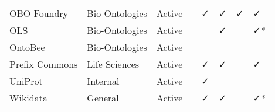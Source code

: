 \begin{table}
\begin{tabular}{llllllll}
    OBO Foundry &  Bio-Ontologies &       Active &                           &                      ✓ &                              ✓ &                           ✓ &                      ✓ \\
            OLS &  Bio-Ontologies &       Active &                           &                        &                              ✓ &                             &                     ✓* \\
        OntoBee &  Bio-Ontologies &       Active &                           &                        &                                &                             &                        \\
 Prefix Commons &   Life Sciences &       Active &                           &                      ✓ &                              ✓ &                             &                      ✓ \\
        UniProt &        Internal &       Active &                           &                      ✓ &                                &                             &                        \\
       Wikidata &         General &       Active &                           &                      ✓ &                              ✓ &                             &                     ✓* \\
\bottomrule
\end{tabular}
\end{table}
